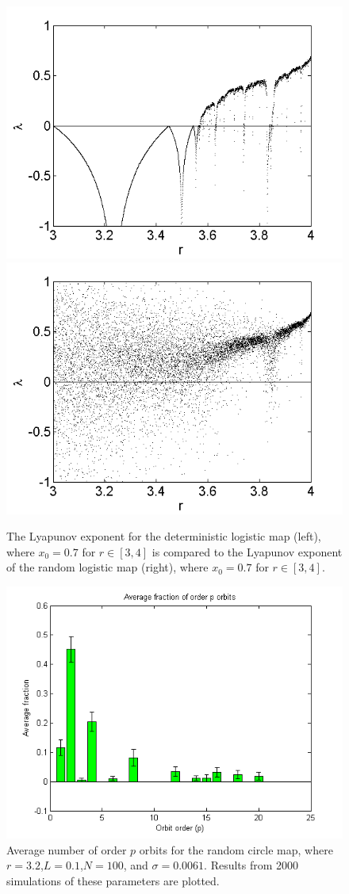 \begin{figure}[!h]
\caption[Lyapunov exponent in the random logistic map compared to the
deterministic map]{The Lyapunov exponent for the deterministic
  logistic map (left), where $x_0=0.7$ for $r \in [3,4]$ is compared
  to the Lyapunov exponent of the random logistic map (right), where
  $x_0=0.7$ for $r \in [3,4]$. }\label{fig:rloglyap2}
\centering
\includegraphics[width=.5\textwidth]{figs/det_log_lyap.png}\hfill
\includegraphics[width=.5\textwidth]{figs/r_log_lyap_zoom.png}
\end{figure}

\begin{figure}[H]\linespread{1}
\caption[Average number of order $p$ orbits for the random circle
map]{Average number of order $p$ orbits for the random circle
map, where $r =3.2$,$L=0.1$,$N=100$, and $\sigma = 0.0061$. Results from 2000
simulations of these parameters are plotted.}
	\begin{center}
          \includegraphics[scale=0.7]{figs/rlog_hist_r32_L01.png}
	\end{center}
\end{figure}

